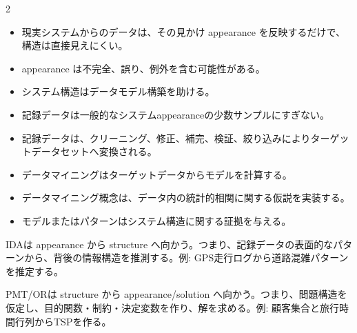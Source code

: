 \clearpage
{}
\begin{multicols}{2}\footnotesize\raggedcolumns
{}
\begin{itemize}
\item 現実システムからのデータは、その見かけ appearance を反映するだけで、構造は直接見えにくい。
\item appearance は不完全、誤り、例外を含む可能性がある。
\item システム構造はデータモデル構築を助ける。
\item 記録データは一般的なシステムappearanceの少数サンプルにすぎない。
\item 記録データは、クリーニング、修正、補完、検証、絞り込みによりターゲットデータセットへ変換される。
\item データマイニングはターゲットデータからモデルを計算する。
\item データマイニング概念は、データ内の統計的相関に関する仮説を実装する。
\item モデルまたはパターンはシステム構造に関する証拠を与える。
\end{itemize}
IDAは appearance から structure へ向かう。つまり、記録データの表面的なパターンから、背後の情報構造を推測する。例: GPS走行ログから道路混雑パターンを推定する。\par

PMT/ORは structure から appearance/solution へ向かう。つまり、問題構造を仮定し、目的関数・制約・決定変数を作り、解を求める。例: 顧客集合と旅行時間行列からTSPを作る。\par


\end{multicols}
